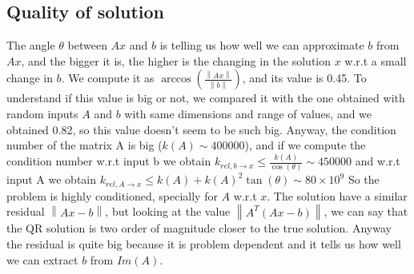 \documentclass{article}
\begin{document}
\subsection{Quality of solution}\label{subsec:quality-of-solution}
The angle $\theta$ between $Ax$ and $b$ is telling us how well we can approximate $b$ from $Ax$, and the bigger it is, the higher is the changing in the solution $x$ w.r.t a small change in $b$.
We compute it as $\arccos\left(\frac{\left\lVert Ax \right\rVert}{\left\lVert b \right\rVert}\right)$, and its value is 0.45.
To understand if this value is big or not, we compared it with the one obtained with random inputs $A$ and $b$ with same dimensions and range of values, and we obtained 0.82, so this value doesn't seem to be such big.
Anyway, the condition number of the matrix A is big ($k(A) \sim 400000$), and if we compute the condition number w.r.t input b we obtain $k_{rel, b\rightarrow x} \leq \frac{k(A)}{\cos(\theta)} \sim 450000$ and w.r.t input A we obtain $k_{rel, A \rightarrow x} \leq k(A) + k(A)^{2} \tan(\theta) \sim 80\times 10^{9}$
So the problem is highly conditioned, specially for $A$ w.r.t $x$.
The solution have a similar residual $\left\lVert Ax - b \right\rVert$, but looking at the value $\left\lVert A^{T}(Ax - b)\right\rVert$, we can say that the QR solution is two order of magnitude closer to the true solution.
Anyway the residual is quite big because it is problem dependent and it tells us how well we can extract $b$ from $Im(A)$.
\end{document}
